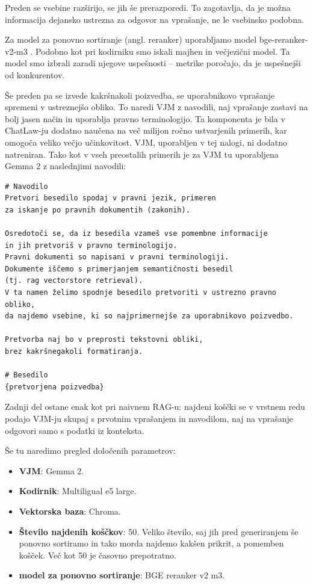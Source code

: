 \documentclass[a4paper,12pt,openright]{book}
\begin{document}
Preden se vsebine razširijo, se jih še prerazporedi. To zagotavlja, da je možna informacija dejansko ustrezna za odgovor na vprašanje, ne le vsebinsko podobna.

Za model za ponovno sortiranje (angl. reranker) uporabljamo model bge-reranker-v2-m3 \cite{bge-reranker-v2-m3_1} \cite{bge-reranker-v2-m3_2}. Podobno kot pri kodirniku smo iskali majhen in večjezični model. Ta model smo izbrali zaradi njegove uspešnosti – metrike poročajo, da je uspešnejši od konkurentov.

Še preden pa se izvede kakršnakoli poizvedba, se uporabnikovo vprašanje spremeni v ustreznejšo obliko. To naredi VJM z navodili, naj vprašanje zastavi na bolj jasen način in uporablja pravno terminologijo. Ta komponenta je bila v ChatLaw-ju dodatno naučena na več milijon ročno ustvarjenih primerih, kar omogoča veliko večjo učinkovitost. VJM, uporabljen v tej nalogi, ni dodatno natreniran. Tako kot v vseh preostalih primerih je za VJM tu uporabljena Gemma 2 z naslednjimi navodili:

\begin{verbatim}
# Navodilo
Pretvori besedilo spodaj v pravni jezik, primeren 
za iskanje po pravnih dokumentih (zakonih).

Osredotoči se, da iz besedila vzameš vse pomembne informacije
in jih pretvoriš v pravno terminologijo.
Pravni dokumenti so napisani v pravni terminologiji.
Dokumente iščemo s primerjanjem semantičnosti besedil
(tj. rag vectorstore retrieval).
V ta namen želimo spodnje besedilo pretvoriti v ustrezno pravno obliko,
da najdemo vsebine, ki so najprimernejše za uporabnikovo poizvedbo. 

Pretvorba naj bo v preprosti tekstovni obliki,
brez kakršnegakoli formatiranja.

# Besedilo
{pretvorjena poizvedba}
\end{verbatim}

Zadnji del ostane enak kot pri naivnem RAG-u: najdeni koščki se v vrstnem redu podajo VJM-ju skupaj s prvotnim vprašanjem in navodilom, naj na vprašanje odgovori samo s podatki iz konteksta.

Še tu naredimo pregled določenih parametrov:

\begin{itemize}
	\item \textbf{VJM}: Gemma 2.
	\item \textbf{Kodirnik}: Multiligual e5 large.
	\item \textbf{Vektorska baza}: Chroma.
	\item \textbf{Število najdenih koščkov}: 50. Veliko število, saj jih pred generiranjem še ponovno sortiramo in tako morda najdemo kakšen prikrit, a pomemben košček. Več kot 50 je časovno prepotratno.
	\item \textbf{model za ponovno sortiranje}: BGE reranker v2 m3.
\end{itemize}
\end{document}
